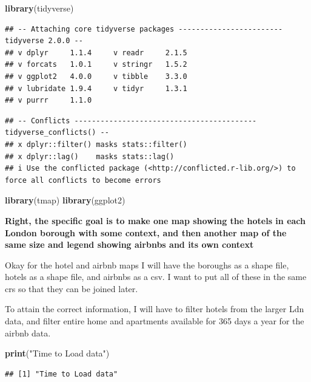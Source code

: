 \documentclass[
]{article}
\newenvironment{Shaded}{\begin{snugshade}}{\end{snugshade}}
\newcommand{\FunctionTok}[1]{\textcolor[rgb]{0.13,0.29,0.53}{\textbf{#1}}}
\newcommand{\NormalTok}[1]{#1}
\newcommand{\StringTok}[1]{\textcolor[rgb]{0.31,0.60,0.02}{#1}}
\begin{document}
\begin{Shaded}
\begin{Highlighting}[]
\FunctionTok{library}\NormalTok{(tidyverse)}
\end{Highlighting}
\end{Shaded}

\begin{verbatim}
## -- Attaching core tidyverse packages ------------------------ tidyverse 2.0.0 --
## v dplyr     1.1.4     v readr     2.1.5
## v forcats   1.0.1     v stringr   1.5.2
## v ggplot2   4.0.0     v tibble    3.3.0
## v lubridate 1.9.4     v tidyr     1.3.1
## v purrr     1.1.0
\end{verbatim}

\begin{verbatim}
## -- Conflicts ------------------------------------------ tidyverse_conflicts() --
## x dplyr::filter() masks stats::filter()
## x dplyr::lag()    masks stats::lag()
## i Use the conflicted package (<http://conflicted.r-lib.org/>) to force all conflicts to become errors
\end{verbatim}

\begin{Shaded}
\begin{Highlighting}[]
\FunctionTok{library}\NormalTok{(tmap)}
\FunctionTok{library}\NormalTok{(ggplot2)}
\end{Highlighting}
\end{Shaded}

\textbf{Right, the specific goal is to make one map showing the hotels
in each London borough with some context, and then another map of the
same size and legend showing airbnbs and its own context}

Okay for the hotel and airbnb maps I will have the boroughs as a shape
file, hotels as a shape file, and airbnbs as a csv. I want to put all of
these in the same crs so that they can be joined later.

To attain the correct information, I will have to filter hotels from the
larger Ldn data, and filter entire home and apartments available for 365
days a year for the airbnb data.

\begin{Shaded}
\begin{Highlighting}[]
\FunctionTok{print}\NormalTok{(}\StringTok{"Time to Load data"}\NormalTok{)}
\end{Highlighting}
\end{Shaded}

\begin{verbatim}
## [1] "Time to Load data"
\end{verbatim}
\end{document}

